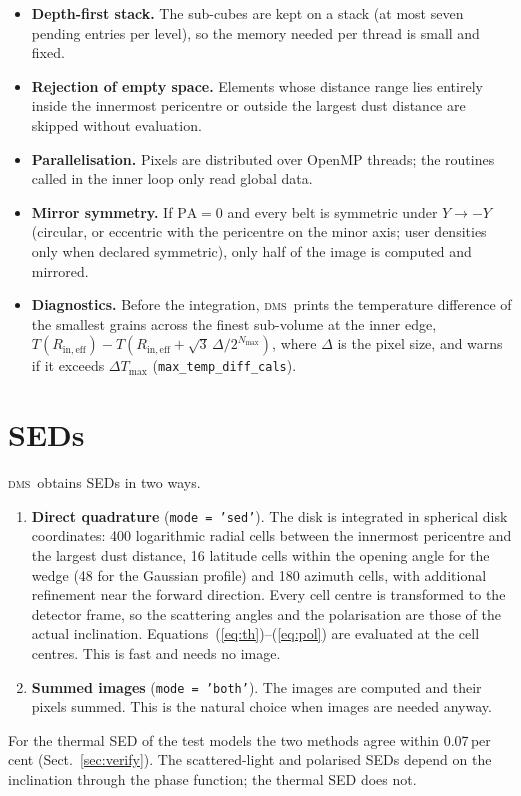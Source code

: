 \documentclass[11pt,a4paper]{article}
\newcommand{\dms}{\textsc{dms}}
\newcommand{\code}[1]{\texttt{#1}}
\begin{document}
\begin{itemize}
\item \textbf{Depth-first stack.} The sub-cubes are kept on a stack (at most seven pending entries
      per level), so the memory needed per thread is small and fixed.
\item \textbf{Rejection of empty space.} Elements whose distance range lies entirely inside the
      innermost pericentre or outside the largest dust distance are skipped without evaluation.
\item \textbf{Parallelisation.} Pixels are distributed over OpenMP threads; the routines called in
      the inner loop only read global data.
\item \textbf{Mirror symmetry.} If $\mathrm{PA}=0$ and every belt is symmetric under
      $Y\to-Y$ (circular, or eccentric with the pericentre on the minor axis; user densities only
      when declared symmetric), only half of the image is computed and mirrored.
\item \textbf{Diagnostics.} Before the integration, \dms\ prints the temperature difference of the
      smallest grains across the finest sub-volume at the inner edge,
      $T(R_\mathrm{in,eff})-T(R_\mathrm{in,eff}+\sqrt3\,\Delta/2^{N_\mathrm{max}})$, where $\Delta$ is
      the pixel size, and warns if it exceeds $\Delta T_\mathrm{max}$
      (\code{max\_temp\_diff\_cals}).
\end{itemize}

\section{SEDs}
\label{sec:sed}

\dms\ obtains SEDs in two ways.
\begin{enumerate}
\item \textbf{Direct quadrature} (\code{mode = 'sed'}). The disk is integrated in spherical disk
      coordinates: 400 logarithmic radial cells between the innermost pericentre and the largest
      dust distance, 16 latitude cells within the opening angle for the wedge (48 for the
      Gaussian profile) and 180 azimuth cells, with additional refinement near the forward
      direction. Every cell centre is transformed to the detector frame, so the scattering angles
      and the polarisation are those of the actual inclination. Equations~(\ref{eq:th})--(\ref{eq:pol})
      are evaluated at the cell centres. This is fast and needs no image.
\item \textbf{Summed images} (\code{mode = 'both'}). The images are computed and their pixels
      summed. This is the natural choice when images are needed anyway.
\end{enumerate}
For the thermal SED of the test models the two methods agree within 0.07\,per cent
(Sect.~\ref{sec:verify}). The scattered-light and polarised SEDs depend on the inclination through
the phase function; the thermal SED does not.
\end{document}
